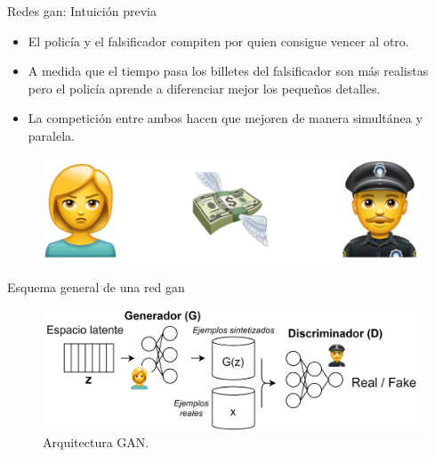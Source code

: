 \begin{frame}{Redes \gls{gan}: Intuición previa}
    
    \begin{itemize}
        \item El policía y el falsificador \alert{compiten} por quien consigue vencer al otro.
        \item A medida que el tiempo pasa los billetes del falsificador son \alert{más realistas} pero el policía aprende a \alert{diferenciar mejor} los pequeños detalles.
        \item La competición entre ambos hacen que mejoren de manera \alert{simultánea y paralela}.
    \end{itemize}
    
    \begin{figure}
        \centering
        \includegraphics[width=\textwidth]{Slides/figures/GAN/PoliciaLadronBilletes 1.PNG}
    \end{figure}
    
\end{frame}

\begin{frame}{Esquema general de una red \gls{gan}}
    
    \begin{figure}
        \centering
        \includegraphics[width=\textwidth]{Slides/figures/GAN/GAN architecture 1.png}
        \caption{Arquitectura GAN.}
    \end{figure}
    
\end{frame}

